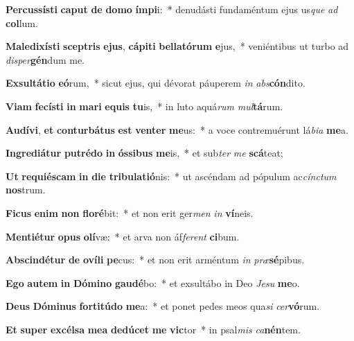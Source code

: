 \item \textbf{Per}\textbf{cus}\textbf{sís}\textbf{ti} \textbf{ca}\textbf{put} \textbf{de} \textbf{do}\textbf{mo} \textbf{ím}\textbf{pi}i:~* denudásti fundaméntum ejus us\textit{que} \textit{ad} \textbf{col}lum.
\item \textbf{Ma}\textbf{le}\textbf{di}\textbf{xís}\textbf{ti} \textbf{scep}\textbf{tris} \textbf{e}\textbf{jus}, \textbf{cá}\textbf{pi}\textbf{ti} \textbf{bel}\textbf{la}\textbf{tó}\textbf{rum} \textbf{e}jus,~* veniéntibus ut turbo ad \textit{di}\textit{sper}\textbf{gén}dum me.
\item \textbf{Ex}\textbf{sul}\textbf{tá}\textbf{ti}\textbf{o} \textbf{e}\textbf{ó}rum,~* sicut ejus, qui dévorat páuperem \textit{in} \textit{abs}\textbf{cón}dito.
\item \textbf{Vi}\textbf{am} \textbf{fe}\textbf{cís}\textbf{ti} \textbf{in} \textbf{ma}\textbf{ri} \textbf{e}\textbf{quis} \textbf{tu}is,~* in luto aquá\textit{rum} \textit{mul}\textbf{tá}rum.
\item \textbf{Au}\textbf{dí}\textbf{vi}, \textbf{et} \textbf{con}\textbf{tur}\textbf{bá}\textbf{tus} \textbf{est} \textbf{ven}\textbf{ter} \textbf{me}us:~* a voce contremuérunt lá\textit{bi}\textit{a} \textbf{me}a.
\item \textbf{In}\textbf{gre}\textbf{di}\textbf{á}\textbf{tur} \textbf{pu}\textbf{tré}\textbf{do} \textbf{in} \textbf{ós}\textbf{si}\textbf{bus} \textbf{me}is,~* et sub\textit{ter} \textit{me} \textbf{scá}teat;
\item \textbf{Ut} \textbf{re}\textbf{qui}\textbf{és}\textbf{cam} \textbf{in} \textbf{di}\textbf{e} \textbf{tri}\textbf{bu}\textbf{la}\textbf{ti}\textbf{ó}nis:~* ut ascéndam ad pópulum ac\textit{cínc}\textit{tum} \textbf{nos}trum.
\item \textbf{Fi}\textbf{cus} \textbf{e}\textbf{nim} \textbf{non} \textbf{flo}\textbf{ré}bit:~* et non erit ger\textit{men} \textit{in} \textbf{ví}neis.
\item \textbf{Men}\textbf{ti}\textbf{é}\textbf{tur} \textbf{o}\textbf{pus} \textbf{o}\textbf{lí}væ:~* et arva non áf\textit{fe}\textit{rent} \textbf{ci}bum.
\item \textbf{Ab}\textbf{scin}\textbf{dé}\textbf{tur} \textbf{de} \textbf{o}\textbf{ví}\textbf{li} \textbf{pe}cus:~* et non erit arméntum \textit{in} \textit{præ}\textbf{sé}pibus.
\item \textbf{E}\textbf{go} \textbf{au}\textbf{tem} \textbf{in} \textbf{Dó}\textbf{mi}\textbf{no} \textbf{gau}\textbf{dé}bo:~* et exsultábo in Deo \textit{Je}\textit{su} \textbf{me}o.
\item \textbf{De}\textbf{us} \textbf{Dó}\textbf{mi}\textbf{nus} \textbf{for}\textbf{ti}\textbf{tú}\textbf{do} \textbf{me}a:~* et ponet pedes meos qua\textit{si} \textit{cer}\textbf{vó}rum.
\item \textbf{Et} \textbf{su}\textbf{per} \textbf{ex}\textbf{cél}\textbf{sa} \textbf{me}\textbf{a} \textbf{de}\textbf{dú}\textbf{cet} \textbf{me} \textbf{vic}tor~* in psal\textit{mis} \textit{ca}\textbf{nén}tem.
